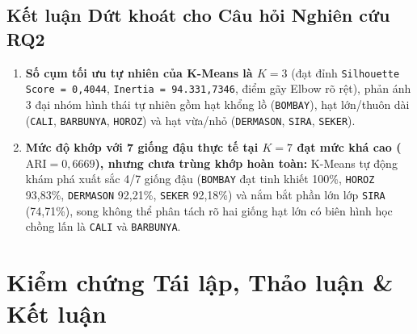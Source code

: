 \documentclass[a4paper,12pt]{report}
\begin{document}
\subsection{Kết luận Dứt khoát cho Câu hỏi Nghiên cứu RQ2}
\begin{enumerate}[leftmargin=*]
    \item \textbf{Số cụm tối ưu tự nhiên của K-Means là $K = 3$} (đạt đỉnh \texttt{Silhouette Score = 0,4044}, \texttt{Inertia = 94.331,7346}, điểm gãy Elbow rõ rệt), phản ánh 3 đại nhóm hình thái tự nhiên gồm hạt khổng lồ (\texttt{BOMBAY}), hạt lớn/thuôn dài (\texttt{CALI}, \texttt{BARBUNYA}, \texttt{HOROZ}) và hạt vừa/nhỏ (\texttt{DERMASON}, \texttt{SIRA}, \texttt{SEKER}).
    \item \textbf{Mức độ khớp với 7 giống đậu thực tế tại $K = 7$ đạt mức khá cao ($\text{ARI} = 0,6669$), nhưng chưa trùng khớp hoàn toàn:} K-Means tự động khám phá xuất sắc 4/7 giống đậu (\texttt{BOMBAY} đạt tinh khiết 100\%, \texttt{HOROZ} 93,83\%, \texttt{DERMASON} 92,21\%, \texttt{SEKER} 92,18\%) và nắm bắt phần lớn lớp \texttt{SIRA} (74,71\%), song không thể phân tách rõ hai giống hạt lớn có biên hình học chồng lấn là \texttt{CALI} và \texttt{BARBUNYA}.
\end{enumerate}

\section{Kiểm chứng Tái lập, Thảo luận \& Kết luận}
\end{document}
